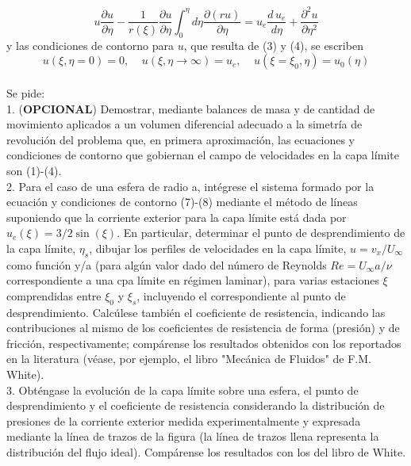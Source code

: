 \documentclass[11pt,a4paper]{article}
\begin{document}
\begin{equation}
u\frac{\partial u}{\partial \eta}-\frac{1}{r(\xi)} \frac{\partial u}{\partial \eta} \int_{0}^{\eta}d \eta \frac{\partial (ru)}{\partial \eta }=u_{e}\frac{d\, u_{e}}{d \eta} + \frac{\partial^{2} u}{\partial \eta^{2}}
\end{equation}
y las condiciones de contorno para $u$, que resulta de (3) y (4), se escriben
\begin{equation}
u(\xi,\eta=0)=0,\;\;\;\; u(\xi, \eta \rightarrow \infty)=u_{e},\;\;\;\; u(\xi=\xi_{0},\eta)=u_{0}(\eta)
\end{equation}
\\
Se pide:
\\

1. (\textbf {OPCIONAL}) Demostrar, mediante balances de masa y de cantidad de movimiento aplicados a un volumen diferencial adecuado a la simetría de revolución del problema que, en primera aproximación, las ecuaciones y condiciones de contorno que gobiernan el campo de velocidades en la capa límite son (1)-(4).
\\

2. Para el caso de una esfera de radio a, intégrese el sistema formado por la ecuación y condiciones de contorno (7)-(8) mediante el método de líneas suponiendo que la corriente exterior para la capa límite está dada por $u_{e}(\xi)=3/2\sin(\xi)$. En particular, determinar el punto de desprendimiento de la capa límite, $\eta_{s}$, dibujar los perfiles de velocidades en la capa límite, $u=v_{x}/U_{\infty}$ como función y/a (para algún valor dado del número de Reynolds $Re=U_{\infty} a/\nu$ correspondiente a una cpa límite en régimen laminar), para varias estaciones $\xi$ comprendidas entre $\xi_{0}$ y $\xi_{s}$, incluyendo el correspondiente al punto de desprendimiento. Calcúlese también el coeficiente de resistencia, indicando las contribuciones al mismo de los coeficientes de resistencia de forma (presión) y de fricción, respectivamente; compárense los resultados obtenidos con los reportados en la literatura (véase, por ejemplo, el libro "Mecánica de Fluidos" de F.M. White).
\\

3. Obténgase la evolución de la capa límite sobre una esfera, el punto de desprendimiento y el coeficiente de resistencia considerando la distribución de presiones de la corriente exterior medida experimentalmente y expresada mediante la línea de trazos de la figura (la línea de trazos llena representa la distribución del flujo ideal). Compárense los resultados con los del libro de White.
\\
\end{document}
